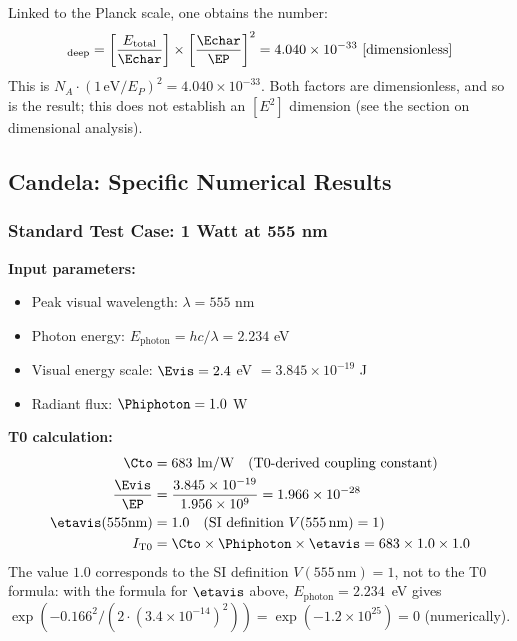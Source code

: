 	Linked to the Planck scale, one obtains the number:
	\begin{equation}
		[n_{\text{T0}}]_{\text{deep}} = \left[\frac{E_{\text{total}}}{\Echar}\right] \times \left[\frac{\Echar}{\EP}\right]^2 = 4.040 \times 10^{-33} \text{ [dimensionless]}
		\label{eq:mol_e2_dimension}
	\end{equation}
	This is $N_A \cdot (1\,\text{eV}/E_P)^2 = 4.040\times10^{-33}$. Both factors are dimensionless, and so is the result; this does not establish an $[E^2]$ dimension (see the section on dimensional analysis).
	
	\subsection{Candela: Specific Numerical Results}
	\label{subsec:candela_numerical_results}
	
	\subsubsection{Standard Test Case: 1 Watt at 555 nm}
	\label{subsubsec:candela_555nm_test}
	
	\textbf{Input parameters:}
	\begin{itemize}
		\item Peak visual wavelength: $\lambda = 555$ nm
		\item Photon energy: $E_{\text{photon}} = hc/\lambda = 2.234$ eV
		\item Visual energy scale: $\Evis = 2.4$ eV $= 3.845 \times 10^{-19}$ J
		\item Radiant flux: $\Phiphoton = 1.0$ W
	\end{itemize}
	
	\textbf{T0 calculation:}
	\begin{align}
		\Cto &= 683 \text{ lm/W} \quad \text{(T0-derived coupling constant)} \\
		\frac{\Evis}{\EP} &= \frac{3.845 \times 10^{-19}}{1.956 \times 10^{9}} = 1.966 \times 10^{-28} \\
		\etavis(555\text{nm}) &= 1.0 \quad \text{(SI definition } V(555\,\text{nm}) = 1\text{)} \\
		I_{\text{T0}} &= \Cto \times \Phiphoton \times \etavis = 683 \times 1.0 \times 1.0
	\end{align}
	The value $1.0$ corresponds to the SI definition $V(555\,\text{nm}) = 1$, not to the T0 formula: with the formula for $\etavis$ above, $E_{\text{photon}} = 2.234$~eV gives $\exp\!\left(-0.166^2/(2\cdot(3.4\times10^{-14})^2)\right) = \exp(-1.2\times10^{25}) = 0$ (numerically).
	
